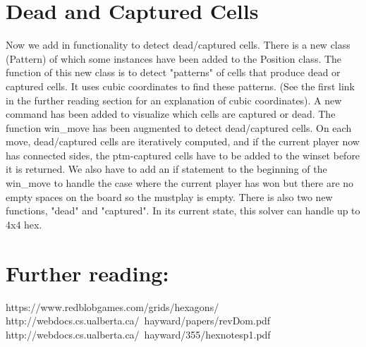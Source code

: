 \documentclass{article}
\begin{document}
\section*{Dead and Captured Cells}
Now we add in functionality to detect dead/captured cells. There is a new class (Pattern) of which some instances have been added to the Position class. The function of this new class is to detect "patterns" of cells that produce dead or captured cells. It uses cubic coordinates to find these patterns. (See the first link in the further reading section for an explanation of cubic coordinates). A new command has been added to visualize which cells are captured or dead. The function win\_move has been augmented to detect dead/captured cells. On each move, dead/captured cells are iteratively computed, and if the current player now has connected sides, the ptm-captured cells have to be added to the winset before it is returned. We also have to add an if statement to the beginning of the win\_move to handle the case where the current player has won but there are no empty spaces on the board so the mustplay is empty. There is also two new functions, "dead" and "captured". In its current state, this solver can handle up to 4x4 hex.
\section*{Further reading:}
	https://www.redblobgames.com/grids/hexagons/\\
	http://webdocs.cs.ualberta.ca/~hayward/papers/revDom.pdf\\
	http://webdocs.cs.ualberta.ca/~hayward/355/hexnotesp1.pdf
\end{document}
